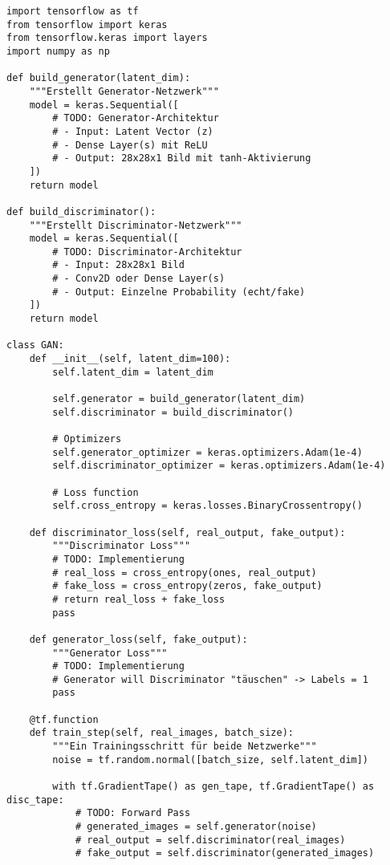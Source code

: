 \documentclass[12pt,a4paper]{article}
\begin{document}
\begin{lstlisting}[caption=GAN für MNIST]
import tensorflow as tf
from tensorflow import keras
from tensorflow.keras import layers
import numpy as np

def build_generator(latent_dim):
    """Erstellt Generator-Netzwerk"""
    model = keras.Sequential([
        # TODO: Generator-Architektur
        # - Input: Latent Vector (z)
        # - Dense Layer(s) mit ReLU
        # - Output: 28x28x1 Bild mit tanh-Aktivierung
    ])
    return model

def build_discriminator():
    """Erstellt Discriminator-Netzwerk"""
    model = keras.Sequential([
        # TODO: Discriminator-Architektur  
        # - Input: 28x28x1 Bild
        # - Conv2D oder Dense Layer(s)
        # - Output: Einzelne Probability (echt/fake)
    ])
    return model

class GAN:
    def __init__(self, latent_dim=100):
        self.latent_dim = latent_dim
        
        self.generator = build_generator(latent_dim)
        self.discriminator = build_discriminator()
        
        # Optimizers
        self.generator_optimizer = keras.optimizers.Adam(1e-4)
        self.discriminator_optimizer = keras.optimizers.Adam(1e-4)
        
        # Loss function
        self.cross_entropy = keras.losses.BinaryCrossentropy()
    
    def discriminator_loss(self, real_output, fake_output):
        """Discriminator Loss"""
        # TODO: Implementierung
        # real_loss = cross_entropy(ones, real_output)
        # fake_loss = cross_entropy(zeros, fake_output)
        # return real_loss + fake_loss
        pass
    
    def generator_loss(self, fake_output):
        """Generator Loss"""
        # TODO: Implementierung
        # Generator will Discriminator "täuschen" -> Labels = 1
        pass
    
    @tf.function
    def train_step(self, real_images, batch_size):
        """Ein Trainingsschritt für beide Netzwerke"""
        noise = tf.random.normal([batch_size, self.latent_dim])
        
        with tf.GradientTape() as gen_tape, tf.GradientTape() as disc_tape:
            # TODO: Forward Pass
            # generated_images = self.generator(noise)
            # real_output = self.discriminator(real_images)
            # fake_output = self.discriminator(generated_images)
            

\end{lstlisting}
\end{document}
